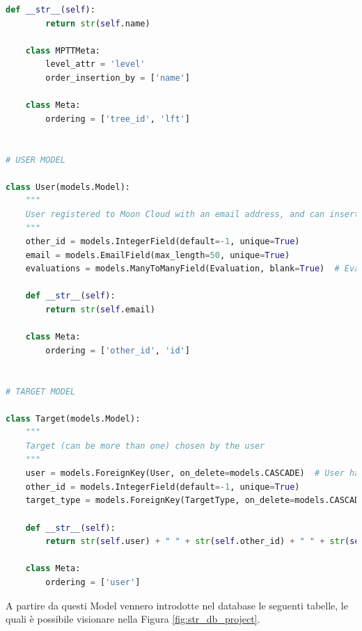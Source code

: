 \begin{lstlisting}[language=Python, label=lst:model, caption={Parti principali del codice che costituiscono i Model della soluzione.}]
    def __str__(self):
        return str(self.name)
 
    class MPTTMeta:
        level_attr = 'level'
        order_insertion_by = ['name']
 
    class Meta:
        ordering = ['tree_id', 'lft']
 
 
# USER MODEL
 
class User(models.Model):
    """
    User registered to Moon Cloud with an email address, and can insert Target and launch Evaluations
    """
    other_id = models.IntegerField(default=-1, unique=True)
    email = models.EmailField(max_length=50, unique=True)
    evaluations = models.ManyToManyField(Evaluation, blank=True)  # Evaluations chosen by user
 
    def __str__(self):
        return str(self.email)
 
    class Meta:
        ordering = ['other_id', 'id']
 
 
# TARGET MODEL
 
class Target(models.Model):
    """
    Target (can be more than one) chosen by the user
    """
    user = models.ForeignKey(User, on_delete=models.CASCADE)  # User has chosen a target_type
    other_id = models.IntegerField(default=-1, unique=True)
    target_type = models.ForeignKey(TargetType, on_delete=models.CASCADE)  # TargetType Id
 
    def __str__(self):
        return str(self.user) + " " + str(self.other_id) + " " + str(self.target_type)
 
    class Meta:
        ordering = ['user']
\end{lstlisting}
%
A partire da questi Model vennero introdotte nel database le seguenti tabelle, le quali è possibile visionare nella Figura 
\ref{fig:str_db_project}.

